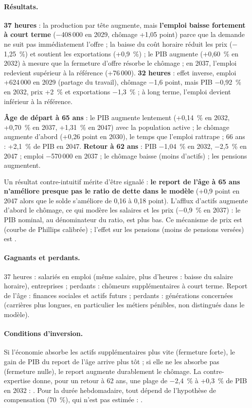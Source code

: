 \paragraph{Résultats.} \textbf{37 heures} : la production par tête augmente, mais \textbf{l'emploi baisse fortement à
court terme} ($-$408\,000 en 2029, chômage +1,05 point) parce que la demande ne suit pas immédiatement l'offre ; la baisse
du coût horaire réduit les prix ($-$1,25~\%) et soutient les exportations (+0,9~\%) ; le PIB augmente (+0,60~\% en 2032)
à mesure que la fermeture d'offre résorbe le chômage ; en 2037, l'emploi redevient supérieur à la référence (+76\,000).
\textbf{32 heures} : effet inverse, emploi +624\,000 en 2029 (partage du travail), chômage $-$1,6 point, mais PIB
$-$0,92~\% en 2032, prix +2~\% et exportations $-$1,3~\% ; à long terme, l'emploi devient inférieur à la référence.

\textbf{Âge de départ à 65 ans} : le PIB augmente lentement (+0,14~\% en 2032, +0,70~\% en 2037, +1,31~\% en 2047) avec la
population active ; le chômage augmente d'abord (+0,26 point en 2030), le temps que l'emploi rattrape ; 66 ans : +2,1~\%
de PIB en 2047. \textbf{Retour à 62 ans} : PIB $-$1,04~\% en 2032, $-$2,5~\% en 2047 ; emploi $-$570\,000 en 2037 ; le chômage
baisse (moins d'actifs) ; les pensions augmentent.

Un résultat contre-intuitif mérite d'être signalé : \textbf{le report de l'âge à 65 ans n'améliore presque pas le
ratio de dette dans le modèle} (+0,9 point en 2047 alors que le solde s'améliore de 0,16 à 0,18 point). L'afflux
d'actifs augmente d'abord le chômage, ce qui modère les salaires et les prix ($-$0,9~\% en 2037) : le PIB nominal, au
dénominateur du ratio, est plus bas. Ce mécanisme de prix est  (courbe de Phillips calibrée) ; l'effet sur
les pensions (moins de pensions versées) est .

\paragraph{Gagnants et perdants.} 37 heures : salariés en emploi (même salaire, plus d'heures : baisse du salaire
horaire), entreprises ; perdants : chômeurs supplémentaires à court terme. Report de l'âge : finances sociales et
actifs futurs ; perdants : générations concernées (carrières plus longues, en particulier les métiers pénibles, non
distingués dans le modèle).

\paragraph{Conditions d'inversion.} Si l'économie absorbe les actifs supplémentaires plus vite (fermeture forte), le
gain de PIB du report de l'âge arrive plus tôt ; si elle ne les absorbe pas (fermeture nulle), le report augmente
durablement le chômage. La contre-expertise donne, pour un retour à 62 ans, une plage de $-$2,4~\% à +0,3~\% de PIB en
2032 : . Pour la durée hebdomadaire, tout dépend de l'hypothèse de compensation (70~\%), qui n'est pas
estimée : .

